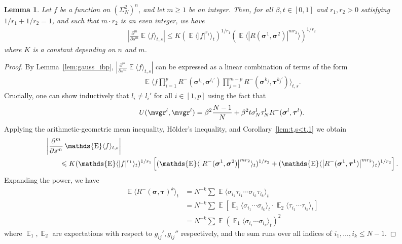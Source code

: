 \documentclass[letterpaper,11pt,reqno]{amsart}
\newtheorem{lem}[thm]{Lemma}
\renewcommand{\ge}{\geqslant}
\renewcommand{\leq}{\leqslant}
\newcommand{\ra}{\rangle}
\newcommand{\la}{\langle}
\newcommand{\abs}[1]{\left\vert#1\right\vert}
\newcommand{\mvgs}{\boldsymbol{\sigma}}\newcommand{\mvgS}{\boldsymbol{\Sigma}}\newcommand{\mvgt}{\boldsymbol{\tau}}
\DeclareMathOperator{\E}{\mathds{E}}
\begin{document}
\begin{lem}\label{lem:deriv_estimate2}
    Let \(f\) be a function on \((\Sigma_{N}^2)^n\), and let \(m\ge 1\) be an integer. Then, for all \(\beta, t \in [0,1]\) and \(r_1, r_2 >0\) satisfying \(1/{r_1} + 1/{r_2} = 1\), and such that \(m\cdot r_2\) is an even integer, we have
    \begin{align*}
        \abs{\frac{\partial^m}{\partial s^m} \E \la f \ra_{t,s} } 
        \leq K (\E \la \abs{f}^{r_1} \ra_{t} )^{1/{r_1}} (\E \la \abs{R(\mvgs^1, \mvgs^2)}^{m r_2} \ra )^{1/{r_2}}
    \end{align*}
    where \(K\) is a constant depending on \(n\) and \(m\).
\end{lem}
\begin{proof}
    By Lemma~\ref{lem:gauss_ibp}, \(\abs{\frac{\partial^m}{\partial s^m} \E \la f \ra_{t,s} }\) can be expressed as a linear combination of terms of the form
    \begin{align*}
        \E \la f  \prod_{i=1}^{p} R^-(\mvgs^{l_i}, \mvgs^{l_i'}) \prod_{j=1}^{m-p} R^-(\mvgs^{k_j}, \mvgt^{k_j'})\ra_{t,s}.
    \end{align*}
    Crucially, one can show inductively that \(l_i \neq l_i'\) for all \(i \in [1, p]\) using the fact that 
    \[
    U(\mvgr^l, \mvgr^{l}) = \beta^2 \frac{N-1}{N} + \beta^2 t \sigma_N^l \tau_N^l R^- (\mvgs^l, \mvgt^l).
    \]
    Applying the arithmetic-geometric mean inequality, H\"older's inequality, and Corollary~\ref{lem:t,s<t,1} we obtain
\begin{align}\label{eq:deriv_estimate}
        &\abs{\frac{\partial^m}{\partial s^m} \E \la f \ra_{t,s} }\notag\\
        &\qquad
        \leq K  (\E \la \abs{f}^{r_1} \ra_{t} )^{1/{r_1}}
        \left[ (\E \la \abs{R^-(\mvgs^1, \mvgs^2)}^{m r_2} \ra_{t} )^{1/{r_2}} +  (\E \la \abs{R^-(\mvgs^1, \mvgt^1)}^{m r_2} \ra_{t} )^{1/{r_2}} \right].
    \end{align}
    Expanding the power, we have
    \begin{align*}
        \E \la R^-(\mvgs, \mvgt)^k \ra_{t}
        &= N^{-k} \sum \E \la \sigma_{i_1}\tau_{i_1} \cdots \sigma_{i_k}\tau_{i_k} \ra_{t} \\
        &= N^{-k} \sum \E \left[ \E_1\la \sigma_{i_1} \cdots \sigma_{i_k} \ra_{t} \cdot \E_2\la \tau_{i_1} \cdots \tau_{i_k} \ra_{t}\right]  \\
        &= N^{-k} \sum \E \left( \E_1\la \sigma_{i_1} \cdots \sigma_{i_k} \ra_{t} \right)^2 
    \end{align*}
    where \(\E_1, \E_2\) are expectations with respect to \(g_{ij}', g_{ij}''\) respectively, and the sum runs over all indices of \(i_1, \ldots,i_k \leq N-1\). 
    

\end{proof}
\end{document}
